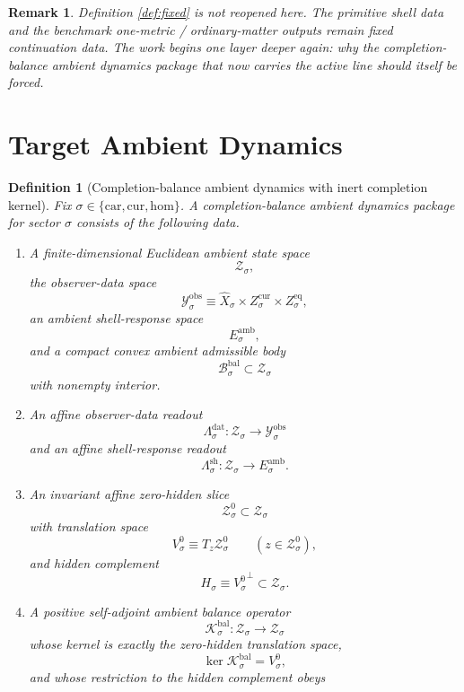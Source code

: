 \documentclass[11pt]{article}
\newcommand{\Car}{\mathrm{car}}
\newcommand{\Cur}{\mathrm{cur}}
\newcommand{\Hom}{\mathrm{hom}}
\newcommand{\VisibleAffine}[1]{\widehat X_{#1}}
\newcommand{\DataSpace}[1]{\mathcal Y_{#1}^{\mathrm{obs}}}
\newcommand{\AmbientTarget}[1]{E_{#1}^{\mathrm{amb}}}
\newcommand{\BalSpace}[1]{\mathcal Z_{#1}}
\newcommand{\BalBody}[1]{\mathcal B_{#1}^{\mathrm{bal}}}
\newcommand{\BalData}[1]{\Lambda_{#1}^{\mathrm{dat}}}
\newcommand{\BalShell}[1]{\Lambda_{#1}^{\mathrm{sh}}}
\newcommand{\ZeroHiddenSlice}[1]{\mathcal Z_{#1}^{0}}
\newcommand{\ZeroHiddenVec}[1]{V_{#1}^{0}}
\newcommand{\BalOp}[1]{\mathcal K_{#1}^{\mathrm{bal}}}
\newcommand{\GapSpace}[1]{H_{#1}}
\newtheorem{definition}{Definition}
\newtheorem{remark}{Remark}
\begin{document}
\begin{remark}
Definition \ref{def:fixed} is not reopened here. The primitive shell data and the benchmark one-metric / ordinary-matter outputs remain fixed continuation data. The work begins one layer deeper again: why the completion-balance ambient dynamics package that now carries the active line should itself be forced.
\end{remark}

\section{Target Ambient Dynamics}

\begin{definition}[Completion-balance ambient dynamics with inert completion kernel]
\label{def:ambient}
Fix \(\sigma\in\{\Car,\Cur,\Hom\}\). A \emph{completion-balance ambient dynamics package} for sector \(\sigma\) consists of the following data.
\begin{enumerate}
    \item A finite-dimensional Euclidean ambient state space
    \[
    \BalSpace{\sigma},
    \]
    the observer-data space
    \[
    \DataSpace{\sigma}
    \equiv
    \VisibleAffine{\sigma}\times Z_{\sigma}^{\mathrm{cur}}\times Z_{\sigma}^{\mathrm{eq}},
    \]
    an ambient shell-response space
    \[
    \AmbientTarget{\sigma},
    \]
    and a compact convex ambient admissible body
    \[
    \BalBody{\sigma}\subset\BalSpace{\sigma}
    \]
    with nonempty interior.
    \item An affine observer-data readout
    \[
    \BalData{\sigma}:\BalSpace{\sigma}\to\DataSpace{\sigma}
    \]
    and an affine shell-response readout
    \[
    \BalShell{\sigma}:\BalSpace{\sigma}\to\AmbientTarget{\sigma}.
    \]
    \item An invariant affine zero-hidden slice
    \[
    \ZeroHiddenSlice{\sigma}\subset\BalSpace{\sigma}
    \]
    with translation space
    \[
    \ZeroHiddenVec{\sigma}\equiv T_{z}\ZeroHiddenSlice{\sigma}
    \qquad
    (z\in\ZeroHiddenSlice{\sigma}),
    \]
    and hidden complement
    \[
    \GapSpace{\sigma}
    \equiv
    {\ZeroHiddenVec{\sigma}}^{\perp}\subset\BalSpace{\sigma}.
    \]
    \item A positive self-adjoint ambient balance operator
    \[
    \BalOp{\sigma}:\BalSpace{\sigma}\to\BalSpace{\sigma}
    \]
    whose kernel is exactly the zero-hidden translation space,
    \[
    \ker\BalOp{\sigma}=\ZeroHiddenVec{\sigma},
    \]
    and whose restriction to the hidden complement obeys

\end{enumerate}
\end{definition}
\end{document}
